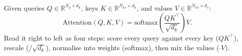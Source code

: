 Given queries $Q\in\mathbb{R}^{N_q\times d_k}$, keys
$K\in\mathbb{R}^{N_{kv}\times d_k}$, and values
$V\in\mathbb{R}^{N_{kv}\times d_v}$\textsuperscript{\cite[][pp.~74--76]{fleuretLittleBookDeep}}:
\begin{equation}
  \mathrm{Attention}(Q,K,V)
  = \mathrm{softmax}\!\left(\frac{QK^{\!\top}}{\sqrt{d_k}}\right)V .
  \label{eq:dl-attention}
\end{equation}
Read it right to left as four steps: score every query against every key
($QK^{\!\top}$), rescale ($/\sqrt{d_k}$), normalise into weights (softmax), then
mix the values ($\cdot V$).

